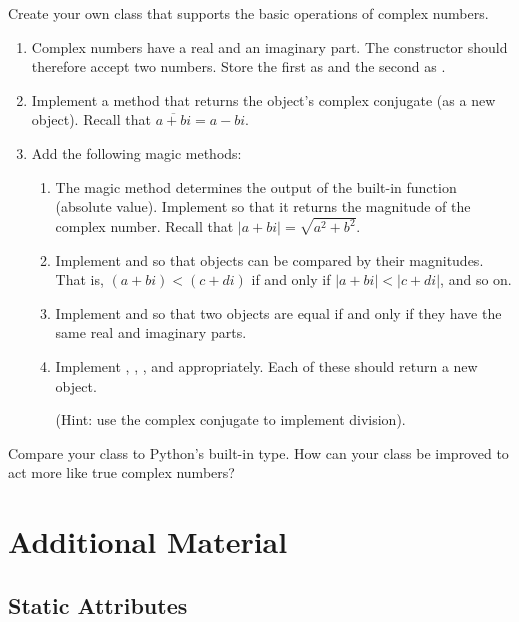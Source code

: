 \begin{problem} %
Create your own  class that supports the basic operations of complex numbers.
\begin{enumerate}
\item Complex numbers have a real and an imaginary part. The constructor should therefore accept two numbers. Store the first as  and the second as .
\item Implement a  method that returns the object's complex conjugate (as a new  object). Recall that $\overline{a + bi} = a - bi$.
\item Add the following magic methods:
\begin{enumerate}
\item The  magic method determines the output of the built-in  function (absolute value). Implement  so that it returns the magnitude of the complex number. Recall that $|a+bi| = \sqrt{a^2+b^2}$.
\item Implement  and  so that  objects can be compared by their magnitudes. That is, $(a+bi) < (c+di)$ if and only if $|a+bi| < |c+di|$, and so on.
\item Implement  and  so that two  objects are equal if and only if they have the same real and imaginary parts.
\item Implement , , , and  appropriately.
Each of these should return a new  object.

(Hint: use the complex conjugate to implement division).
\end{enumerate}
\end{enumerate}
Compare your class to Python's built-in  type.
How can your class be improved to act more like true complex numbers?
\end{problem}

\newpage

\section*{Additional Material} %

\subsection*{Static Attributes} %

